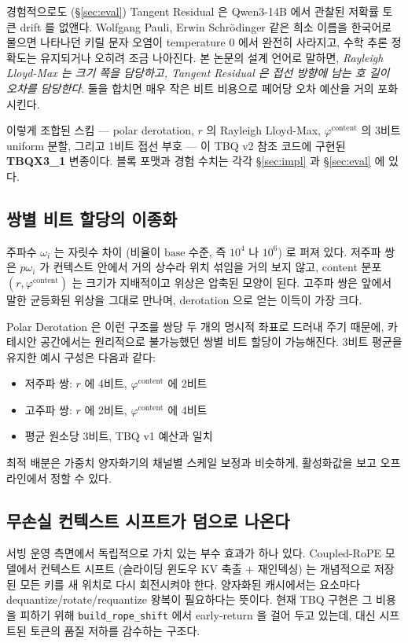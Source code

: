 \documentclass[10pt,twocolumn]{article}
\begin{document}
경험적으로도 (\S\ref{sec:eval}) Tangent Residual 은 Qwen3-14B 에서 관찰된 저확률 토큰 drift 를 없앤다. Wolfgang Pauli, Erwin Schrödinger 같은 희소 이름을 한국어로 물으면 나타나던 키릴 문자 오염이 temperature $0$ 에서 완전히 사라지고, 수학 추론 정확도는 유지되거나 오히려 조금 나아진다. 본 논문의 설계 언어로 말하면, \emph{Rayleigh Lloyd-Max 는 크기 쪽을 담당하고, Tangent Residual 은 접선 방향에 남는 호 길이 오차를 담당한다}. 둘을 합치면 매우 작은 비트 비용으로 페어당 오차 예산을 거의 포화시킨다.

이렇게 조합된 스킴 --- polar derotation, $r$ 의 Rayleigh Lloyd-Max, $\varphi^{\text{content}}$ 의 3비트 uniform 분할, 그리고 1비트 접선 부호 --- 이 TBQ v2 참조 코드에 구현된 \textbf{TBQX3\_1} 변종이다. 블록 포맷과 경험 수치는 각각 \S\ref{sec:impl} 과 \S\ref{sec:eval} 에 있다.

\subsection{쌍별 비트 할당의 이종화}
\label{sec:hetero}

주파수 $\omega_i$ 는 자릿수 차이 (비율이 $\text{base}$ 수준, 즉 $10^4$ 나 $10^6$) 로 퍼져 있다. 저주파 쌍은 $p\omega_i$ 가 컨텍스트 안에서 거의 상수라 위치 섞임을 거의 보지 않고, content 분포 $(r,\varphi^{\text{content}})$ 는 크기가 지배적이고 위상은 압축된 모양이 된다. 고주파 쌍은 앞에서 말한 균등화된 위상을 그대로 만나며, derotation 으로 얻는 이득이 가장 크다.

Polar Derotation 은 이런 구조를 쌍당 두 개의 명시적 좌표로 드러내 주기 때문에, 카테시안 공간에서는 원리적으로 불가능했던 쌍별 비트 할당이 가능해진다. 3비트 평균을 유지한 예시 구성은 다음과 같다:
\begin{itemize}[leftmargin=*,topsep=1pt,itemsep=0pt]
\item 저주파 쌍: $r$ 에 4비트, $\varphi^{\text{content}}$ 에 2비트
\item 고주파 쌍: $r$ 에 2비트, $\varphi^{\text{content}}$ 에 4비트
\item 평균 원소당 3비트, TBQ v1 예산과 일치
\end{itemize}
최적 배분은 가중치 양자화기의 채널별 스케일 보정과 비슷하게, 활성화값을 보고 오프라인에서 정할 수 있다.

\subsection{무손실 컨텍스트 시프트가 덤으로 나온다}
\label{sec:shift}

서빙 운영 측면에서 독립적으로 가치 있는 부수 효과가 하나 있다. Coupled-RoPE 모델에서 컨텍스트 시프트 (슬라이딩 윈도우 KV 축출 + 재인덱싱) 는 개념적으로 저장된 모든 키를 새 위치로 다시 회전시켜야 한다. 양자화된 캐시에서는 요소마다 dequantize/rotate/requantize 왕복이 필요하다는 뜻이다. 현재 TBQ 구현은 그 비용을 피하기 위해 \texttt{build\_rope\_shift} 에서 early-return 을 걸어 두고 있는데, 대신 시프트된 토큰의 품질 저하를 감수하는 구조다.
\end{document}
